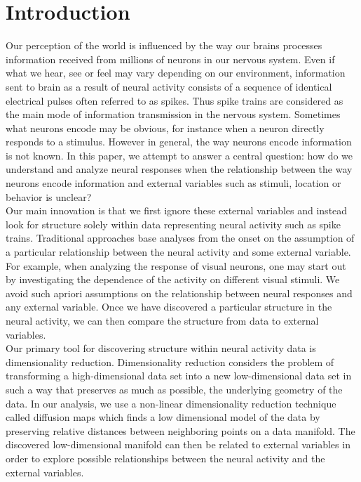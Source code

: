 
\section{Introduction}
 Our perception of the world is influenced by the way our brains processes information received from millions of neurons
 in our nervous system. Even if what we hear, see or feel may vary depending on our environment, information sent to brain
 as a result of neural activity consists of a sequence of identical electrical pulses often referred to as spikes.
Thus spike trains are considered as the main mode of information transmission in the nervous system.  Sometimes what neurons encode may be obvious, for instance when a neuron directly responds to a stimulus. However in general,  the way neurons encode information is not known. In this paper, we attempt to answer a central question: how do we understand
and analyze neural responses when the relationship between the way neurons encode information and external variables
such as stimuli, location or behavior  is unclear? \\
 
Our main innovation is  that we  first ignore these external variables and instead look for structure solely within data representing neural activity such as spike trains. Traditional approaches base analyses from the onset on the assumption of a particular relationship between the neural activity and some external variable.
For example, when analyzing the response of visual neurons, one may start out by investigating the dependence of the activity on different visual stimuli. We avoid such apriori assumptions on the relationship between neural responses and any external variable.  Once we have discovered a particular structure in the neural activity, we can then compare the structure
from data to external variables. \\

Our primary tool for discovering structure within neural activity data is dimensionality reduction.
Dimensionality reduction considers the problem of  transforming a high-dimensional data set into a new low-dimensional data set in  such a way that preserves as much as possible, the underlying geometry of the data. In our analysis, we use a non-linear dimensionality reduction technique called diffusion maps which finds a low dimensional model of the  data by preserving relative distances between neighboring points on a data manifold. The discovered low-dimensional manifold
can then be related to external variables in order to explore possible relationships between the neural activity and the
external variables.\\

